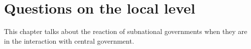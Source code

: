 
\chapter{Questions on the  local level}
This chapter talks about the reaction of subnational governments when they are in the interaction with central government.

\section{}

\section{}




